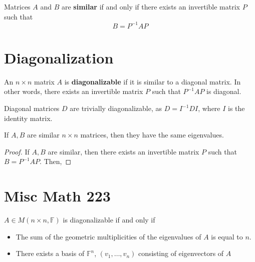 \documentclass[letterpaper,12pt]{article}
\begin{document}
\begin{definition}
Matrices $A$ and $B$ are \textbf{similar} if and only if there exists an invertible matrix $P$ such that
\begin{equation*}
    B = P^{-1} A P
\end{equation*}
\end{definition}



\section*{Diagonalization}
\begin{definition}
An $n \times n$ matrix $A$ is \textbf{diagonalizable} if it is similar to a diagonal matrix. In other words, there exists an invertible matrix $P$ such that $P^{-1}AP$ is diagonal.
\end{definition}

\begin{example}
Diagonal matrices $D$ are trivially diagonalizable, as $D = I^{-1} D I$, where $I$ is the identity matrix.
\end{example}

\begin{theorem}
If $A, B$ are similar $n \times n$ matrices, then they have the same eigenvalues.
\end{theorem}
\begin{proof}
If $A, B$ are similar, then there exists an invertible matrix $P$ such that $B = P^{-1} A P$. Then,
\end{proof}


















\section*{Misc Math 223}

\begin{corollary}
$A \in M(n \times n, \mathbb{F})$ is diagonalizable if and only if
\begin{itemize}
    \item The sum of the geometric multiplicities of the eigenvalues of $A$ is equal to $n$.
    \item There exists a basis of $\mathbb{F}^n$, $(v_1, \dots, v_n)$ consisting of eigenvectors of $A$
\end{itemize}
\end{corollary}
\end{document}
